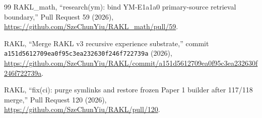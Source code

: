 \begin{thebibliography}{99}
RAKL\_math,
``research(ym): bind YM-E1a1a0 primary-source retrieval boundary,''
Pull Request 59 (2026),
\url{https://github.com/SzeChunYiu/RAKL_math/pull/59}.

RAKL,
``Merge RAKL v3 recursive experience substrate,''
commit \texttt{a151d5612709ea0f95c3ea232630f246f722739a} (2026),
\url{https://github.com/SzeChunYiu/RAKL/commit/a151d5612709ea0f95c3ea232630f246f722739a}.

RAKL,
``fix(ci): purge symlinks and restore frozen Paper 1 builder after 117/118 merge,''
Pull Request 120 (2026),
\url{https://github.com/SzeChunYiu/RAKL/pull/120}.

\end{thebibliography}
